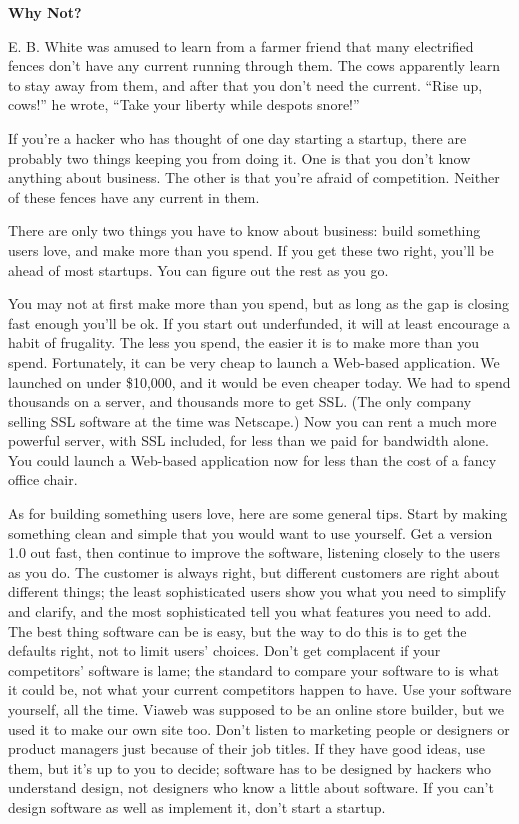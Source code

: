 \documentclass[12pt]{book}
\begin{document}
\textbf{Why Not?}

E. B. White was amused to learn from a farmer friend that many
electrified fences don't have any current running through them. The cows
apparently learn to stay away from them, and after that you don't need
the current. ``Rise up, cows!'' he wrote, ``Take your liberty while
despots snore!''

If you're a hacker who has thought of one day starting a startup, there
are probably two things keeping you from doing it. One is that you don't
know anything about business. The other is that you're afraid of
competition. Neither of these fences have any current in them.

There are only two things you have to know about business: build
something users love, and make more than you spend. If you get these two
right, you'll be ahead of most startups. You can figure out the rest as
you go.

You may not at first make more than you spend, but as long as the gap is
closing fast enough you'll be ok. If you start out underfunded, it will
at least encourage a habit of frugality. The less you spend, the easier
it is to make more than you spend. Fortunately, it can be very cheap to
launch a Web-based application. We launched on under \$10,000, and it
would be even cheaper today. We had to spend thousands on a server, and
thousands more to get SSL. (The only company selling SSL software at the
time was Netscape.) Now you can rent a much more powerful server, with
SSL included, for less than we paid for bandwidth alone. You could
launch a Web-based application now for less than the cost of a fancy
office chair.

As for building something users love, here are some general tips. Start
by making something clean and simple that you would want to use
yourself. Get a version 1.0 out fast, then continue to improve the
software, listening closely to the users as you do. The customer is
always right, but different customers are right about different things;
the least sophisticated users show you what you need to simplify and
clarify, and the most sophisticated tell you what features you need to
add. The best thing software can be is easy, but the way to do this is
to get the defaults right, not to limit users' choices. Don't get
complacent if your competitors' software is lame; the standard to
compare your software to is what it could be, not what your current
competitors happen to have. Use your software yourself, all the time.
Viaweb was supposed to be an online store builder, but we used it to
make our own site too. Don't listen to marketing people or designers or
product managers just because of their job titles. If they have good
ideas, use them, but it's up to you to decide; software has to be
designed by hackers who understand design, not designers who know a
little about software. If you can't design software as well as implement
it, don't start a startup.
\end{document}
